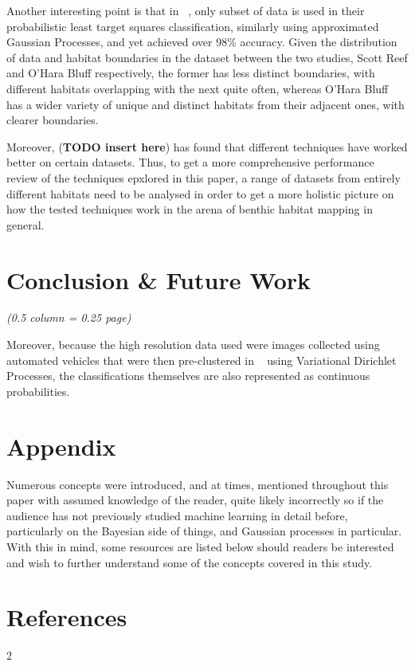 \documentclass[10pt,sts]{article}
\begin{document}
\begin{multicols}{2}
Another interesting point is that in ~\citet{bender12}, only subset of data is used in their probabilistic least target squares classification, similarly using approximated Gaussian Processes, and yet achieved over 98\% accuracy. Given the distribution of data and habitat boundaries in the dataset between the two studies, Scott Reef and O'Hara Bluff respectively, the former has less distinct boundaries, with different habitats overlapping with the next quite often, whereas O'Hara Bluff has a wider variety of unique and distinct habitats from their adjacent ones, with clearer boundaries.

Moreover, (\textbf{TODO insert here}) has found that different techniques have worked better on certain datasets. Thus, to get a more comprehensive performance review of the techniques epxlored in this paper, a range of datasets from entirely different habitats need to be analysed in order to get a more holistic picture on how the tested techniques work in the arena of benthic habitat mapping in general.

\vfill
\columnbreak

\section{Conclusion \& Future Work}
\textit{(0.5 column = 0.25 page)}

Moreover, because the high resolution data used were images collected using automated vehicles that were then pre-clustered in ~\citet{steinberg11} using Variational Dirichlet Processes, the classifications themselves are also represented as continuous probabilities.

\section{Appendix}
Numerous concepts were introduced, and at times, mentioned throughout this paper with assumed knowledge of the reader, quite likely incorrectly so if the audience has not previously studied machine learning in detail before, particularly on the Bayesian side of things, and Gaussian processes in particular. With this in mind, some resources are listed below should readers be interested and wish to further understand some of the concepts covered in this study.

\section{References}





\end{multicols}{2}
\end{document}
